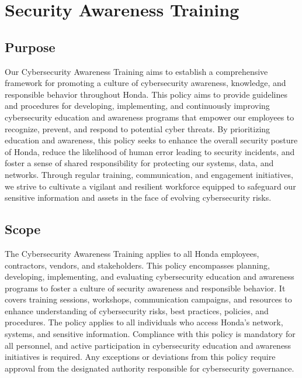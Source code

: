 \chapter{Security Awareness Training}
\pagestyle{fancy}

\fancyhf{}

\fancyfoot[C]{\thepage}

\renewcommand{\headrulewidth}{0pt}
\renewcommand{\footrulewidth}{0pt}

\section* {Purpose}
Our Cybersecurity Awareness Training aims to establish a comprehensive framework for promoting a culture of cybersecurity awareness, knowledge, and responsible behavior throughout Honda. This policy aims to provide guidelines and procedures for developing, implementing, and continuously improving cybersecurity education and awareness programs that empower our employees to recognize, prevent, and respond to potential cyber threats. By prioritizing education and awareness, this policy seeks to enhance the overall security posture of Honda, reduce the likelihood of human error leading to security incidents, and foster a sense of shared responsibility for protecting our systems, data, and networks. Through regular training, communication, and engagement initiatives, we strive to cultivate a vigilant and resilient workforce equipped to safeguard our sensitive information and assets in the face of evolving cybersecurity risks.
\section* {Scope}
The Cybersecurity Awareness Training applies to all Honda employees, contractors, vendors, and stakeholders. This policy encompasses planning, developing, implementing, and evaluating cybersecurity education and awareness programs to foster a culture of security awareness and responsible behavior. It covers training sessions, workshops, communication campaigns, and resources to enhance understanding of cybersecurity risks, best practices, policies, and procedures. The policy applies to all individuals who access Honda's network, systems, and sensitive information. Compliance with this policy is mandatory for all personnel, and active participation in cybersecurity education and awareness initiatives is required. Any exceptions or deviations from this policy require approval from the designated authority responsible for cybersecurity governance.
